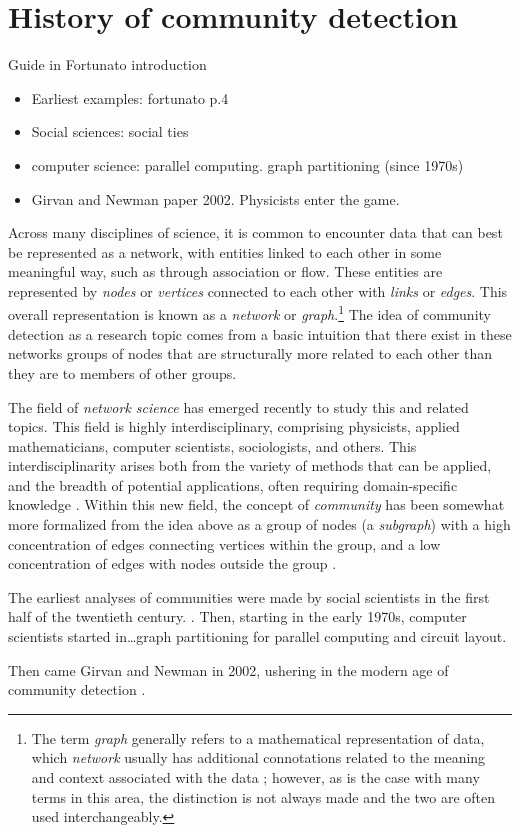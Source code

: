 \section{History of community
detection}\label{history-of-community-detection}

Guide in Fortunato introduction

\begin{itemize}
\tightlist
\item
  Earliest examples: fortunato p.4
\item
  Social sciences: social ties
\item
  computer science: parallel computing. graph partitioning (since 1970s)
\item
  Girvan and Newman paper 2002. Physicists enter the game.
\end{itemize}

Across many disciplines of science, it is common to encounter data that
can best be represented as a network, with entities linked to each other
in some meaningful way, such as through association or flow. These
entities are represented by \emph{nodes} or \emph{vertices} connected to
each other with \emph{links} or \emph{edges}. This overall
representation is known as a \emph{network} or \emph{graph}.\footnote{The
  term \emph{graph} generally refers to a mathematical representation of
  data, which \emph{network} usually has additional connotations related
  to the meaning and context associated with the data
  \autocite{porter_communities_2009}; however, as is the case with many
  terms in this area, the distinction is not always made and the two are
  often used interchangeably.} The idea of community detection as a
research topic comes from a basic intuition that there exist in these
networks groups of nodes that are structurally more related to each
other than they are to members of other groups.

The field of \emph{network science} has emerged recently to study this
and related topics. This field is highly interdisciplinary, comprising
physicists, applied mathematicians, computer scientists, sociologists,
and others. This interdisciplinarity arises both from the variety of
methods that can be applied, and the breadth of potential applications,
often requiring domain-specific knowledge
\autocite{porter_communities_2009}. Within this new field, the concept
of \emph{community} has been somewhat more formalized from the idea
above as a group of nodes (a \emph{subgraph}) with a high concentration
of edges connecting vertices within the group, and a low concentration
of edges with nodes outside the group
\autocite{fortunato_community_2010}.

The earliest analyses of communities were made by social scientists in
the first half of the twentieth century. . Then, starting
in the early 1970s, computer scientists started in\ldots{}graph
partitioning for parallel computing and circuit layout.

Then came Girvan and Newman in 2002, ushering in the modern age of
community detection \autocite{lancichinetti_community_2009}.
